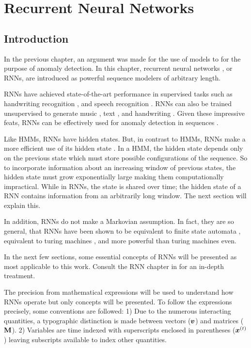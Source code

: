 \chapter{Recurrent Neural Networks}
\label{ch:rnn}

\section{Introduction}

In the previous chapter, an argument was made for the use of models to for the purpose of anomaly detection. In this chapter, recurrent neural networks \cite{Rumelhart1986}, or RNNs, are introduced as powerful sequence modelers of arbitrary length.

RNNs have achieved state-of-the-art performance in supervised tasks such as handwriting recognition \cite{Graves2009}, and speech recognition  \cite{Graves2013}. RNNs can also be trained unsupervised to generate  music  \cite{Boulanger-Lewandowski2012}, text \cite{Martens2011a,Graves2013b}, and handwriting \cite{Graves2013b}. Given these impressive feats, RNNs can be effectively used for anomaly detection in sequences \cite{Marchi2015,Malhotra2015}.

Like HMMs, RNNs have hidden states. But, in contrast to HMMs, RNNs make a more efficient use of its hidden state \cite{ZacharyC.Lipton2015}. In a HMM, the hidden state depends only on the previous state which must store possible configurations of the sequence. So to incorporate information about an increasing window of previous states, the hidden state must grow exponentially large making them computationally impractical. While in RNNs, the state is shared over time; the hidden state of a RNN contains information from an arbitrarily long window. The next section will explain this.

In addition, RNNs do not make a Markovian assumption. In fact, they are so general, that RNNs have been shown to be equivalent to finite state automata \cite{Minsky1967}, equivalent to turing machines \cite{Siegelmann1995}, and more powerful than turing machines \cite{Siegelmann1993} even.

In the next few sections, some essential concepts of RNNs will be presented as most applicable to this work. Consult the RNN chapter in \cite{Bengio-et-al-2015-Book} for an in-depth treatment.

The precision from mathematical expressions will be used to understand how RNNs operate but only concepts will be presented. To follow the expressions precisely, some conventions are followed: 1) Due to the numerous interacting quantities, a typographic distinction is made between vectors ($\boldsymbol{v}$) and  matrices ($\mathbf{M}$). 2) Variables are time indexed with superscripts enclosed in parentheses ($\boldsymbol{x}^{(t)}$) leaving subscripts available to index other quantities.

